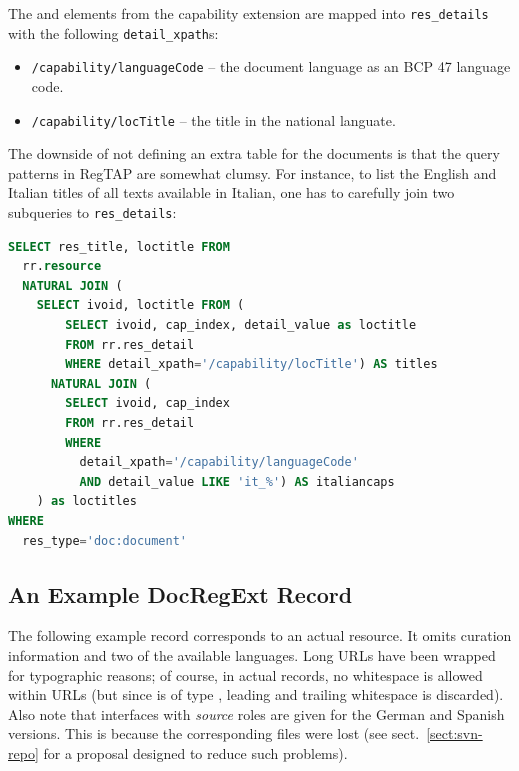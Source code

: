 \documentclass{ivoa}
\begin{document}
The  and  elements from the
 capability extension are mapped into
\verb|res_details| with the following \verb|detail_xpath|s:

\begin{itemize}

\item \texttt{/capability/languageCode} -- the document language as an 
BCP 47 \citep{std:BCP47} language code.
\item \texttt{/capability/locTitle} -- the title in the national
languate.
\end{itemize}

The downside of not defining an extra table for the documents is that
the query patterns in RegTAP are somewhat clumsy.  For instance, to list
the English and Italian titles of all texts available in Italian, one
has to carefully join two subqueries to \verb|res_details|:

\begin{lstlisting}[language=SQL]
SELECT res_title, loctitle FROM
  rr.resource 
  NATURAL JOIN (
    SELECT ivoid, loctitle FROM (
        SELECT ivoid, cap_index, detail_value as loctitle
        FROM rr.res_detail
        WHERE detail_xpath='/capability/locTitle') AS titles
      NATURAL JOIN (
        SELECT ivoid, cap_index 
        FROM rr.res_detail
        WHERE 
          detail_xpath='/capability/languageCode'
          AND detail_value LIKE 'it_%') AS italiancaps
    ) as loctitles
WHERE
  res_type='doc:document'
\end{lstlisting}

\subsection{An Example DocRegExt Record}

The following example record corresponds to an actual resource.  It
omits curation information and two of the available languages.  Long
URLs have been wrapped for typographic reasons; of course, in actual
records, no whitespace is allowed within URLs (but since
 is of type , leading and trailing
whitespace is discarded).  Also note that interfaces with
\textit{source} roles
are given for the German and Spanish versions.  This is because the
corresponding files were lost (see sect.~\ref{sect:svn-repo} for a
proposal designed to reduce such problems).


\end{document}
